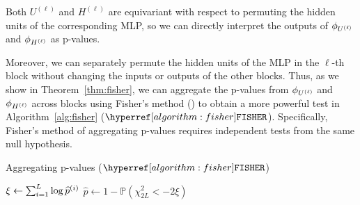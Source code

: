 Both $U^{(\ell)}$ and $H^{(\ell)}$ are equivariant with respect to permuting the hidden units of the corresponding MLP, so we can directly interpret the outputs of $\phi_{U^{(\ell)}}$ and $\phi_{H^{(\ell)}}$ as p-values.
{Moreover, we can separately permute the hidden units of the MLP in the $\ell$-th block without changing the inputs or outputs of the other blocks.
Thus, as we show in Theorem~\ref{thm:fisher},
we can aggregate the p-values from $\phi_{U^{(\ell)}}$ and $\phi_{H^{(\ell)}}$ across blocks using Fisher's method (\cite{fisher_qa}) to obtain a more powerful test in Algorithm~\ref{alg:fisher} ($\fisher$). Specifically, Fisher's method of aggregating p-values requires independent tests from the same null hypothesis.

\begin{algorithm}[h]\label{algorithm:fisher}
    \DontPrintSemicolon
    \caption{Aggregating p-values ($\fisher$)}
    \label{alg:fisher}
    \KwOut{p-value $\hat{p} \in (0,1]$}
    $\xi \gets \sum_{i=1}^L \log \widehat{p}^{(i)}$\;
    $\hat{p} \gets 1-\mathbb{P}(\chi^2_{2L} < -2\xi)$\;
\end{algorithm}

}
